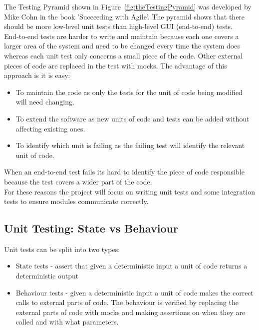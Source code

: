		The Testing Pyramid shown in Figure~\ref{fig:theTestingPyramid} was developed by Mike Cohn in the book 'Succeeding with Agile'\cite{Cohn_2010}. The pyramid shows that there should be more low-level unit tests than high-level GUI (end-to-end) tests.\\
		
		End-to-end tests are harder to write and maintain because each one covers a larger area of the system and need to be changed every time the system does whereas each unit test only concerns a small piece of the code. Other external pieces of code are replaced in the test with mocks. The advantage of this approach is it is easy:
		
		\begin{itemize}
			\item To maintain the code as only the tests for the unit of code being modified will need changing.
			\item To extend the software as new units of code and tests can be added without affecting existing ones.
			\item To identify which unit is failing as the failing test will identify the relevant unit of code.
		\end{itemize}
		
		When an end-to-end test fails its hard to identify the piece of code responsible because the test covers a wider part of the code.\\
		
		For these reasons the project will focus on writing unit tests and some integration tests to ensure modules communicate correctly.
		
		\subsection{Unit Testing: State vs Behaviour}				
		Unit tests can be split into two types:
		
		\begin{itemize}
			\item State tests - assert that given a deterministic input a unit of code returns a deterministic output
			\item Behaviour tests - given a deterministic input a unit of code makes the correct calls to external parts of code. The behaviour is verified by replacing the external parts of code with mocks and making assertions on when they are called and with what parameters.
		\end{itemize}				
		
